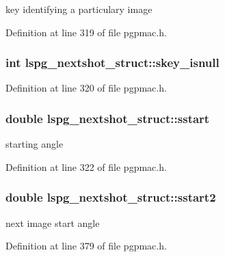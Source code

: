 key identifying a particulary image 



Definition at line 319 of file pgpmac.\-h.

\hypertarget{structlspg__nextshot__struct_abd3c69357470052eb79ddd8eddd57b2c}{
\subsubsection[{skey\-\_\-isnull}]{\setlength{\rightskip}{0pt plus 5cm}int lspg\-\_\-nextshot\-\_\-struct\-::skey\-\_\-isnull}}\label{structlspg__nextshot__struct_abd3c69357470052eb79ddd8eddd57b2c}


Definition at line 320 of file pgpmac.\-h.

\hypertarget{structlspg__nextshot__struct_a8dc11eaa094d59f61642c4abc226918f}{
\subsubsection[{sstart}]{\setlength{\rightskip}{0pt plus 5cm}double lspg\-\_\-nextshot\-\_\-struct\-::sstart}}\label{structlspg__nextshot__struct_a8dc11eaa094d59f61642c4abc226918f}


starting angle 



Definition at line 322 of file pgpmac.\-h.

\hypertarget{structlspg__nextshot__struct_a8445cbd2206dc6d62b6bd433f5218c98}{
\subsubsection[{sstart2}]{\setlength{\rightskip}{0pt plus 5cm}double lspg\-\_\-nextshot\-\_\-struct\-::sstart2}}\label{structlspg__nextshot__struct_a8445cbd2206dc6d62b6bd433f5218c98}


next image start angle 



Definition at line 379 of file pgpmac.\-h.

